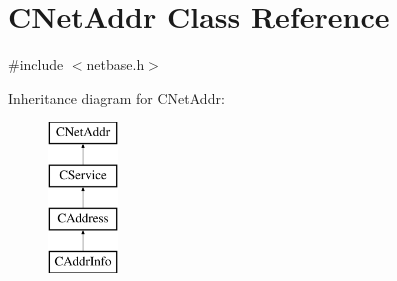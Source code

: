 \hypertarget{class_c_net_addr}{}\section{C\+Net\+Addr Class Reference}
\label{class_c_net_addr}


{\ttfamily \#include $<$netbase.\+h$>$}

Inheritance diagram for C\+Net\+Addr\+:\begin{figure}[H]
\begin{center}
\leavevmode
\includegraphics[height=4.000000cm]{class_c_net_addr}
\end{center}
\end{figure}
